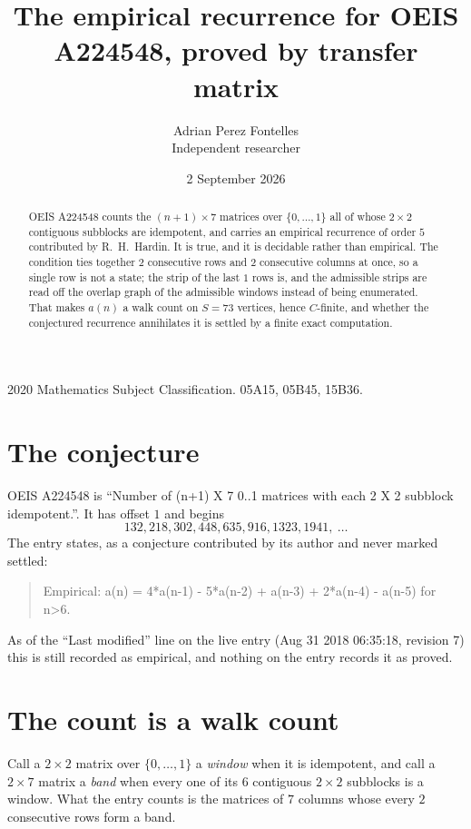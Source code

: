 \documentclass[11pt,a4paper]{article}
\title{The empirical recurrence for OEIS A224548, proved by transfer matrix}
\author{Adrian Perez Fontelles\\ \small Independent researcher}
\date{2 September 2026}
\theoremstyle{plain}
\theoremstyle{definition}
\begin{document}
\maketitle

\begin{abstract}
OEIS A224548 counts the $(n+1)\times7$ matrices over $\{0,\dots,1\}$ all of whose
$2\times2$ contiguous subblocks are idempotent, and carries an empirical recurrence of order
$5$ contributed by R.~H.~Hardin. It is true, and it is decidable rather than empirical.
The condition ties together $2$ consecutive rows and $2$ consecutive columns at once, so a
single row is not a state; the strip of the last $1$ rows is, and the admissible strips
are read off the overlap graph of the admissible windows instead of being enumerated. That
makes $a(n)$ a walk count on $S=73$ vertices, hence $C$-finite, and whether the conjectured
recurrence annihilates it is settled by a finite exact computation.
\end{abstract}

\noindent\small 2020 Mathematics Subject Classification. 05A15, 05B45, 15B36.\normalsize

\section{The conjecture}

OEIS A224548 is ``Number of (n+1) X 7 0..1 matrices with each 2 X 2 subblock idempotent.''. It has offset $1$ and begins
\[
132, 218, 302, 448, 635, 916, 1323, 1941,\ \dots
\]
The entry states, as a conjecture contributed by its author and never marked settled:
\begin{quote}
Empirical: a(n) = 4*a(n-1) - 5*a(n-2) + a(n-3) + 2*a(n-4) - a(n-5) for n>6.
\end{quote}
As of the ``Last modified'' line on the live entry (Aug 31 2018 06:35:18, revision 7) this is still
recorded as empirical, and nothing on the entry records it as proved.

\section{The count is a walk count}

Call a $2\times2$ matrix over $\{0,\dots,1\}$ a \emph{window} when it is idempotent, and
call a $2\times7$ matrix a \emph{band} when every one of its $6$ contiguous
$2\times2$ subblocks is a window. What the entry counts is the matrices of $7$ columns
whose every $2$ consecutive rows form a band.
\end{document}
